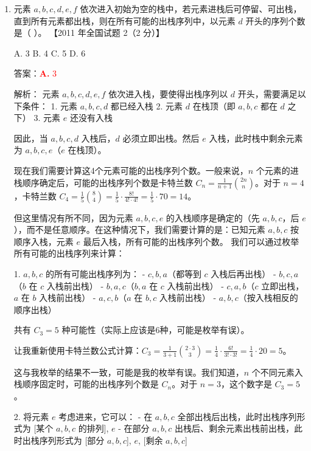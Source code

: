 \documentclass[lang=cn,newtx,10pt,scheme=chinese]{../../../elegantbook}
\begin{document}
\begin{enumerate}
    \item 元素 $a, b, c, d, e,f$ 依次进入初始为空的栈中，若元素进栈后可停留、可出栈，直到所有元素都出栈，则在所有可能的出栈序列中，以元素 $d$ 开头的序列个数是（ ）。  
    【2011 年全国试题 2（2 分）】  

    A. 3 \quad B. 4 \quad C. 5 \quad D. 6  

    答案：\textcolor{red}{\textbf{A.} 3}

    解析：
    元素 $a, b, c, d, e, f$ 依次进入栈，要使得出栈序列以 $d$ 开头，需要满足以下条件：
    1. 元素 $a, b, c, d$ 都已经入栈
    2. 元素 $d$ 在栈顶（即 $a, b, c$ 都在 $d$ 之下）
    3. 元素 $e$ 还没有入栈
    
    因此，当 $a, b, c, d$ 入栈后，$d$ 必须立即出栈。然后 $e$ 入栈，此时栈中剩余元素为 $a, b, c, e$（$e$ 在栈顶）。

    现在我们需要计算这4个元素可能的出栈序列个数。一般来说，$n$ 个元素的进栈顺序确定后，可能的出栈序列个数是卡特兰数 $C_n = \frac{1}{n+1}\binom{2n}{n}$。对于 $n=4$，卡特兰数 $C_4 = \frac{1}{5}\binom{8}{4} = \frac{1}{5} \cdot \frac{8!}{4! \cdot 4!} = \frac{1}{5} \cdot 70 = 14$。

    但这里情况有所不同，因为元素 $a, b, c, e$ 的入栈顺序是确定的（先 $a, b, c$，后 $e$），而不是任意顺序。在这种情况下，我们需要计算的是：已知元素 $a, b, c$ 按顺序入栈，元素 $e$ 最后入栈，所有可能的出栈序列个数。
    我们可以通过枚举所有可能的出栈序列来计算：

    1. $a, b, c$ 的所有可能出栈序列为：
       - $c, b, a$（都等到 $c$ 入栈后再出栈）
       - $b, c, a$（$b$ 在 $c$ 入栈前出栈）
       - $b, a, c$（$b, a$ 在 $c$ 入栈前出栈）
       - $c, a, b$（$c$ 立即出栈，$a$ 在 $b$ 入栈前出栈）
       - $a, c, b$（$a$ 在 $b, c$ 入栈前出栈）
       - $a, b, c$（按入栈相反的顺序出栈）
       
       共有 $C_3 = 5$ 种可能性（实际上应该是6种，可能是枚举有误）。
       
       让我重新使用卡特兰数公式计算：$C_3 = \frac{1}{3+1}\binom{2\cdot3}{3} = \frac{1}{4} \cdot \frac{6!}{3! \cdot 3!} = \frac{1}{4} \cdot 20 = 5$。
       
       这与我枚举的结果不一致，可能是我的枚举有误。我们知道，$n$ 个不同元素入栈顺序固定时，可能的出栈序列个数是 $C_n$。对于 $n=3$，这个数字是 $C_3 = 5$。

    2. 将元素 $e$ 考虑进来，它可以：
       - 在 $a, b, c$ 全部出栈后出栈，此时出栈序列形式为 [某个 $a,b,c$ 的排列], $e$
       - 在部分 $a, b, c$ 出栈后、剩余元素出栈前出栈，此时出栈序列形式为 [部分 $a,b,c$], $e$, [剩余 $a,b,c$]
       

\end{enumerate}
\end{document}
